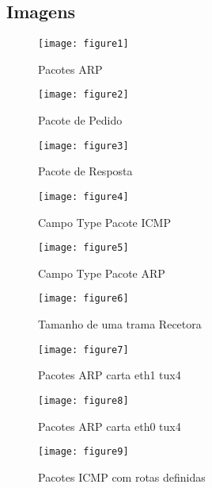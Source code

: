 \subsection*{Imagens}

\begin{figure}[ht]
	\texttt{[image: figure1]}                                                      
    \caption{Pacotes ARP}
    \label{fig:fig1}
\end{figure}

\begin{figure}[ht]
	\texttt{[image: figure2]}                                                      
    \caption{Pacote de Pedido}
    \label{fig:fig2}
\end{figure}

\begin{figure}[ht]
	\texttt{[image: figure3]}                                                      
    \caption{Pacote de Resposta}
    \label{fig:fig3}
\end{figure}

\begin{figure}[ht]
	\texttt{[image: figure4]}                                                      
    \caption{Campo Type Pacote ICMP}
    \label{fig:fig4}
\end{figure}

\begin{figure}[ht]
	\texttt{[image: figure5]}                                                      
    \caption{Campo Type Pacote ARP}
    \label{fig:fig5}
\end{figure}

\begin{figure}[ht]
	\texttt{[image: figure6]}                                                      
    \caption{Tamanho de uma trama Recetora}
    \label{fig:fig6}
\end{figure}

\begin{figure}[ht]
	\texttt{[image: figure7]}                                                      
    \caption{Pacotes ARP carta eth1 tux4}
    \label{fig:fig7}
\end{figure}

\begin{figure}[ht]
	\texttt{[image: figure8]}                                                      
    \caption{Pacotes ARP carta eth0 tux4}
    \label{fig:fig8}
\end{figure}

\begin{figure}[ht]
	\texttt{[image: figure9]}                                                      
    \caption{Pacotes ICMP com rotas definidas}
    \label{fig:fig9}
\end{figure}


